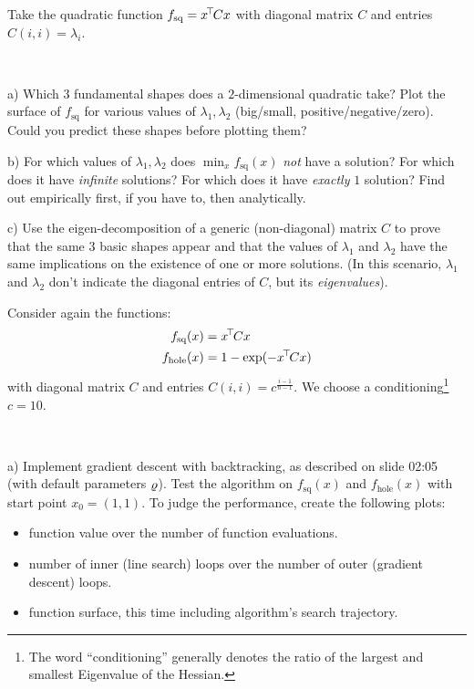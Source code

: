 

\renewcommand{\course}{Optimization}
\renewcommand{\coursepicture}{optim}
\renewcommand{\coursedate}{Summer 2015}
\renewcommand{\exnum}{2}

\exercises
{}
\exercisestitle



Take the quadratic function $f_\text{sq} = x^{\!\top\!} C x$ with diagonal matrix $C$
and entries $C(i, i)=\lambda_i$.

~

a) Which $3$ fundamental shapes does a $2$-dimensional quadratic take?  Plot
the surface of $f_\text{sq}$ for various values of $\lambda_1, \lambda_2$
(big/small, positive/negative/zero).  Could you predict these shapes before
plotting them?

b) For which values of $\lambda_1, \lambda_2$ does $\min_x f_\text{sq}(x)$
\emph{not} have a solution?  For which does it have \emph{infinite} solutions?
For which does it have \emph{exactly} $1$ solution?  Find out empirically
first, if you have to, then analytically.

c) Use the eigen-decomposition of a generic (non-diagonal) matrix $C$ to prove
that the same $3$ basic shapes appear and that the values of $\lambda_1$ and
$\lambda_2$ have the same implications on the existence of one or more
solutions.  (In this scenario, $\lambda_1$ and $\lambda_2$ don't indicate the
diagonal entries of $C$, but its \emph{eigenvalues}).




Consider again the functions:
\begin{align}
f_\text{sq}(x)
 &= x^{\!\top\!} C x \\
f_\text{hole}(x)
 &= 1-\exp(-x^{\!\top\!} C x)
\end{align}
with diagonal matrix $C$ and entries $C(i,i) =
c^{\frac{i-1}{n-1}}$. We choose a conditioning\footnote{The
word ``conditioning'' generally denotes the ratio of the largest and
smallest Eigenvalue of the Hessian.} $c=10$.

~

a) Implement gradient descent with backtracking, as described on slide
02:05 (with default parameters $\varrho$). Test the algorithm on
$f_\text{sq}(x)$ and $f_\text{hole}(x)$ with start point
$x_0=(1,1)$. To judge the performance, create the following plots:
\begin{itemize}
  \item function value over the number of function evaluations.
  \item number of inner (line search) loops over the number of outer (gradient descent) loops.
  \item function surface, this time including algorithm's search trajectory.
\end{itemize}

